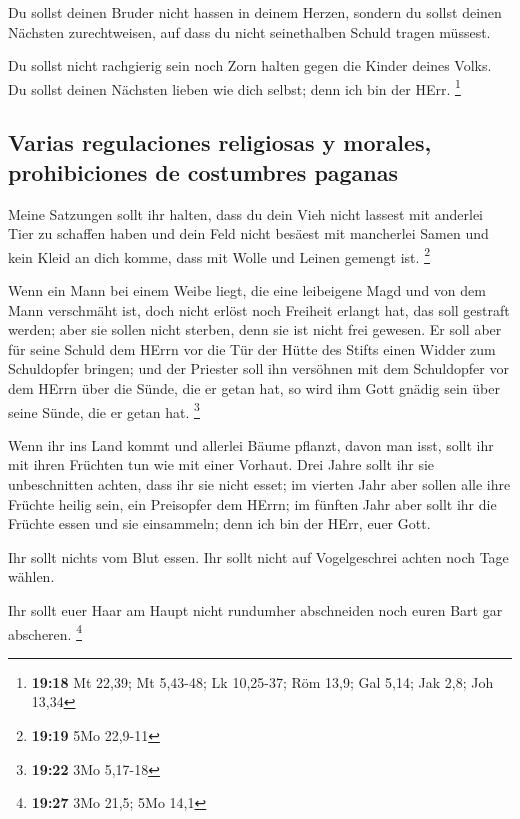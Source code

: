  Du sollst deinen Bruder nicht hassen in deinem Herzen,
sondern du sollst deinen Nächsten zurechtweisen, auf dass du nicht
seinethalben Schuld tragen müssest.

 Du sollst nicht rachgierig sein noch Zorn halten gegen
die Kinder deines Volks. Du sollst deinen Nächsten lieben wie dich
selbst; denn ich bin der HErr. \footnote{\textbf{19:18} Mt 22,39; Mt
  5,43-48; Lk 10,25-37; Röm 13,9; Gal 5,14; Jak 2,8; Joh 13,34}

\hypertarget{varias-regulaciones-religiosas-y-morales-prohibiciones-de-costumbres-paganas}{%
\subsection{Varias regulaciones religiosas y morales, prohibiciones de
costumbres
paganas}\label{varias-regulaciones-religiosas-y-morales-prohibiciones-de-costumbres-paganas}}

 Meine Satzungen sollt ihr halten, dass du dein Vieh
nicht lassest mit anderlei Tier zu schaffen haben und dein Feld nicht
besäest mit mancherlei Samen und kein Kleid an dich komme, dass mit
Wolle und Leinen gemengt ist. \footnote{\textbf{19:19} 5Mo 22,9-11}

 Wenn ein Mann bei einem Weibe liegt, die eine leibeigene
Magd und von dem Mann verschmäht ist, doch nicht erlöst noch Freiheit
erlangt hat, das soll gestraft werden; aber sie sollen nicht sterben,
denn sie ist nicht frei gewesen.  Er soll aber für seine
Schuld dem HErrn vor die Tür der Hütte des Stifts einen Widder zum
Schuldopfer bringen;  und der Priester soll ihn versöhnen
mit dem Schuldopfer vor dem HErrn über die Sünde, die er getan hat, so
wird ihm Gott gnädig sein über seine Sünde, die er getan hat.
\footnote{\textbf{19:22} 3Mo 5,17-18}

 Wenn ihr ins Land kommt und allerlei Bäume pflanzt,
davon man isst, sollt ihr mit ihren Früchten tun wie mit einer Vorhaut.
Drei Jahre sollt ihr sie unbeschnitten achten, dass ihr sie nicht esset;
 im vierten Jahr aber sollen alle ihre Früchte heilig
sein, ein Preisopfer dem HErrn;  im fünften Jahr aber
sollt ihr die Früchte essen und sie einsammeln; denn ich bin der HErr,
euer Gott.

 Ihr sollt nichts vom Blut essen. Ihr sollt nicht auf
Vogelgeschrei achten noch Tage wählen.

 Ihr sollt euer Haar am Haupt nicht rundumher abschneiden
noch euren Bart gar abscheren. \footnote{\textbf{19:27} 3Mo 21,5; 5Mo
  14,1}

